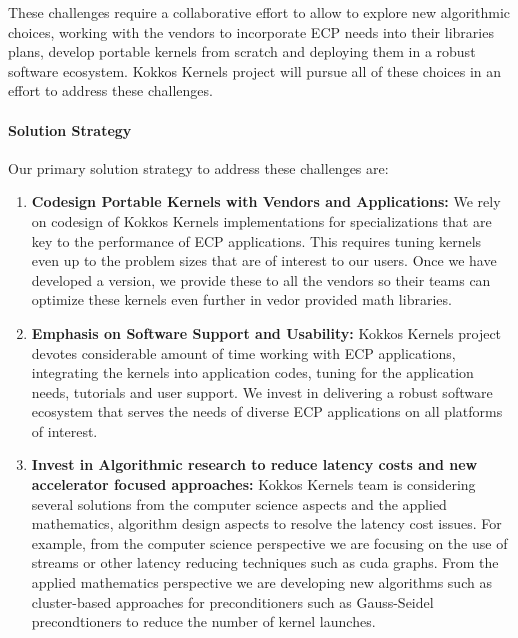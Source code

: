 These challenges require a collaborative effort to allow to explore new algorithmic choices,
working with the vendors to incorporate ECP needs into their libraries plans, develop
portable kernels from scratch and deploying them in a robust software ecosystem. Kokkos
Kernels project will pursue all of these choices in an effort to address these challenges.

\paragraph{Solution Strategy}

Our primary solution strategy to address these challenges are:
\begin{enumerate}
    \item \textbf{Codesign Portable Kernels with Vendors and Applications:}
    We rely on codesign of Kokkos Kernels implementations for
    specializations that are key to the performance of ECP applications. This
    requires tuning kernels even up to the problem sizes that are of interest
    to our users. Once we have developed a version, we provide these
    to all the vendors so their teams can optimize these kernels even
    further in vedor provided math libraries.
   \item \textbf{Emphasis on Software Support and Usability:}
	Kokkos Kernels project devotes considerable amount of time working with
	ECP applications, integrating the kernels into application codes, tuning
	for the application needs, tutorials and user support. We invest
	in delivering a robust software ecosystem that serves the
	needs of diverse ECP applications on all platforms of interest.
   \item \textbf{Invest in Algorithmic research to reduce latency costs and new accelerator focused approaches:} 
   Kokkos Kernels team is considering several solutions from the computer science
   aspects and the applied mathematics, algorithm design aspects to resolve the latency cost issues.
   For example, from the computer science perspective we are focusing on the
   use of streams or other latency reducing techniques such as cuda graphs. From
   the applied mathematics perspective we are developing new algorithms such
   as cluster-based approaches for preconditioners such as Gauss-Seidel precondtioners
   to reduce the number of kernel launches. 
\end{enumerate}

